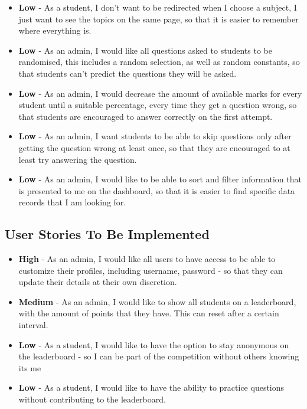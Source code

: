 \documentclass[]{final_report}
\begin{document}
\begin{itemize}
	\item \textbf{Low} - As a student, I don't want to be redirected when I choose a subject, I just want to see the topics on the same page, so that it is easier to remember where everything is.
	
	\item \textbf{Low} - As an admin, I would like all questions asked to students to be randomised, this includes a random selection, as well as random constants, so that students can't predict the questions they will be asked.

	\item \textbf{Low} - As an admin, I would decrease the amount of available marks for every student until a suitable percentage, every time they get a question wrong, so that students are encouraged to answer correctly on the first attempt.

	\item \textbf{Low} - As an admin, I want students to be able to skip questions only after getting the question wrong at least once, so that they are encouraged to at least try answering the question.
	
	\item \textbf{Low} - As an admin, I would like to be able to sort and filter information that is presented to me on the dashboard, so that it is easier to find specific data records that I am looking for.
	
\end{itemize}
\subsection{User Stories To Be Implemented}
\begin{itemize}
	\item \textbf{High} - As an admin, I would like all users to have access to be able to customize their profiles, including username, password - so that they can update their details at their own discretion.
	
	\item \textbf{Medium} - As an admin, I would like to show all students on a leaderboard, with the amount of points that they have. This can reset after a certain interval.
	
	\item \textbf{Low} - As a student, I would like to have the option to stay anonymous on the leaderboard - so I can be part of the competition without others knowing its me
	
	\item \textbf{Low} - As a student, I would like to have the ability to practice questions without contributing to the leaderboard.
\end{itemize}
\end{document}
